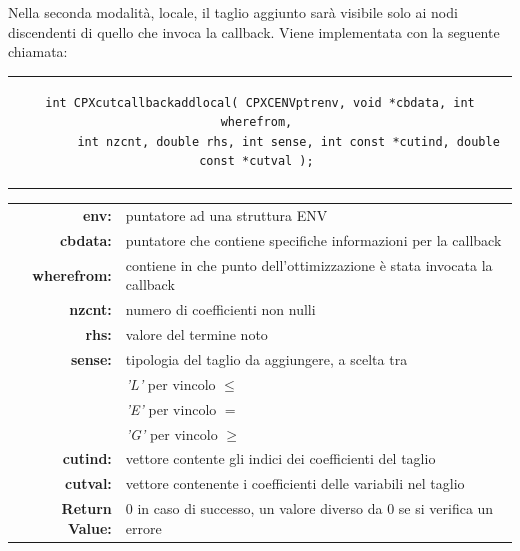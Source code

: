Nella seconda modalità, locale, il taglio aggiunto sarà visibile solo ai nodi discendenti di quello che invoca la callback. Viene implementata con la seguente chiamata:
\begin{center}
\begin{tabular}{c}
\begin{lstlisting}[linewidth=400pt, basicstyle=\footnotesize\sffamily,] 
int CPXcutcallbackaddlocal( CPXCENVptrenv, void *cbdata, int wherefrom, 
		int nzcnt, double rhs, int sense, int const *cutind, double const *cutval ); 
\end{lstlisting}
\end{tabular}
\end{center}
\begin{table}[h]
\centering
\begin{tabular}{rl}
\textbf{env:} & {puntatore ad una struttura ENV}\\
\textbf{cbdata:} & {puntatore che contiene specifiche informazioni per la callback}\\
\textbf{wherefrom:} & {contiene in che punto dell'ottimizzazione è stata invocata la callback} \\ 
\textbf{nzcnt:} & {numero di coefficienti non nulli} \\
\textbf{rhs:} & {valore del termine noto} \\
\textbf{sense:} & {tipologia del taglio da aggiungere, a scelta tra} \\
&{\textit{'L'} per vincolo $\leq$}\\
&{\textit{'E'} per vincolo $=$}\\
&{\textit{'G'} per vincolo $\geq$}\\
\textbf{cutind:} & {vettore contente gli indici dei coefficienti del taglio} \\
\textbf{cutval:} & {vettore contenente i coefficienti delle variabili nel taglio} \\
\textbf{Return Value:} & {0 in caso di successo, un valore diverso da 0 se si verifica un errore}\\ 
\end{tabular}
\end{table}
